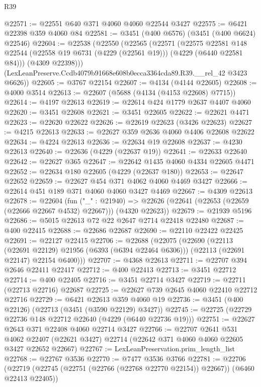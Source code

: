 \begin{lexlean}{R39}
\begin{coremodule}
@22571 := @22551 @640 @371 @4060 @4060 @22544 @3427
@22575 := @6421 @22398 @359 @4060 @84
@22581 := @3451 (@400 @6576) (@3451 (@400 @6624) @22546)
@22604 := @22538
    (@22550
      (@22565
        (@22571
          (@22575
            @22581
            @148
            @22544
            (@22558 @19 @6731 (@4229 (@22561 @19)))
            (@4229 (@6440 @22581 @84)))
          (@4309 @22398)))
      (LexLeanPreserve.Ccdb4079b91668e608b0ecca3364cda89.R39.__rel_42 @3423 @6626))
@22605 := @3767 @22154
@22607 := @4134 (@4144 @22605)
@22608 := @4000 @3514
@22613 := @22607 (@5688 (@4134 (@4153 @22608) @7715))
@22614 := @4197 @22613
@22619 := @22614 @424 @1779 @2637 @4407 @4060
@22620 := @3451 @22608
@22621 := @3451 @22605
@22622 := @22621 @4471
@22623 := @22620 @22622
@22626 := @22619 @22623 (@3426 @22623)
@22627 := @4215 @22613
@22633 := @22627 @359 @2636 @4060 @4406 @22608 @22622
@22634 := @4224 @22613
@22636 := @22634 @19 @22608
@22637 := @4230 @22613
@22640 := @22636 (@4229 (@22637 @19))
@22641 := @22633 @22640
@22642 := @22627 @365
@22647 := @22642 @1435 @4060 @4334 @22605 @4471
@22652 := @22634 @180 @22605 (@4229 (@22637 @180))
@22653 := @22647 @22652
@22659 := @22627 @454 @371 @4062 @4060 @4469 @3427
@22666 := @22614 @451 @189 @371 @4060 @4060 @3427 @4469
@22667 := @4309 @22613
@22678 := @22604
    (fun ("_" : @21940) =>
    @22626 (@22641 (@22653 (@22659 (@22666 @22667 @4532) @22667))) (@4320 @22623))
@22679 := @21939 @5196
@22686 := @5015 @22613 @72 @22 @2647 @2714 @22418 @22480
@22687 := @400 @22415
@22688 := @22686 @22687
@22690 := @22110 @22422 @22425
@22691 := @22127 @22415
@22706 := @22688
    (@22075
      (@22690
        (@22113 (@22691 @22129) @21956 (@6393 (@6394 @22464 @6306)))
        (@22113 (@22691 @22147) @22154 @6400)))
@22707 := @4368 @22613
@22711 := @22707 @394 @2646 @22411 @22417
@22712 := @400 @22413
@22713 := @3451 @22712
@22714 := @400 @22405
@22716 := @3451 @22714 @3427
@22719 := @22711 (@22713 @22716) @22687
@22725 := @22627 @739 @2645 @4060 @22410 @22712 @22716
@22729 := @6421 @22613 @359 @4060 @19
@22736 := @3451 (@400 @22126) (@22713 (@3451 (@3590 @22129) @3427))
@22745 := @22725 (@22729 @22736 @148 @22712 @22640 (@4229 (@6440 @22736 @19)))
@22751 := @22627 @2643 @371 @22408 @4060 @22714 @3427
@22766 := @22707
    @2641
    @531
    @4062
    @22407
    (@22621 @3427)
    @22714
    (@22642 @371 @4060 @4060 @22605 @3427 @22652 @22667)
@22767 := LexLeanPreservation.prim_length_list
@22768 := @22767 @3536
@22770 := @7477 @3536 @3766
@22781 := @22706
    (@22719 (@22745 (@22751 (@22766 (@22768 @22770 @22154)) @22667)) (@6460 @22413 @22405))

\end{coremodule}
\end{lexlean}
